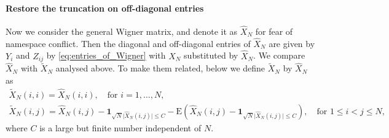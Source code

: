 \documentclass[11pt, a4paper]{article}
\numberwithin{equation}{section}
\newcommand{\E}{\mathrm{E}}
\newcommand{\id}{\mathbf{1}}
\theoremstyle{definition}
\theoremstyle{remark}
\begin{document}
\paragraph{Restore the truncation on off-diagonal entries}

Now we consider the general Wigner matrix, and denote it as $\hat{X}_N$ for fear of namespace conflict. Then the diagonal and off-diagonal entries of $\hat{X}_N$ are given by $Y_i$ and $Z_{ij}$ by \eqref{eq:entries_of_Wigner} with $X_N$ substituted by $\hat{X}_N$. We compare $\hat{X}_N$ with $\tilde{X}_N$ analysed above. To make them related, below we define $\tilde{X}_N$ by $\hat{X}_N$ as
\begin{gather}
  \tilde{X}_N(i, i) = \hat{X}_N(i, i), \quad \text{for $i = 1, \dotsc, N$,} \\
  \tilde{X}_N(i, j) = \hat{X}_N(i, j) - \id_{\sqrt{N} \lvert \hat{X}_N(i, j) \rvert \leq C} - \E(\hat{X}_N(i, j) - \id_{\sqrt{N} \lvert \hat{X}_N(i, j) \rvert \leq C}), \quad \text{for $1 \leq i < j \leq N$,}
\end{gather}
where $C$ is a large but finite number independent of $N$.
\end{document}
